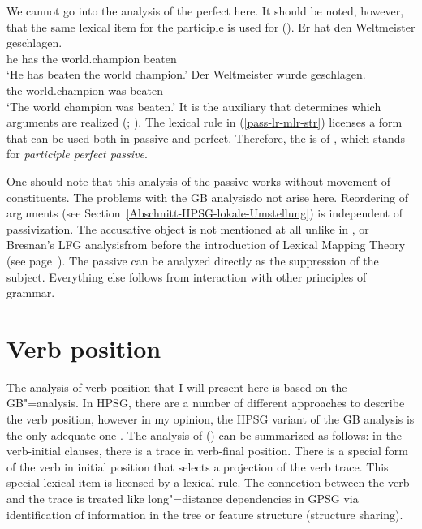 We cannot go into the analysis of the perfect here. It should be noted, however, that the same lexical
item for the participle is
used for ().
\eal
\ex 
\gll Er hat den Weltmeister geschlagen.\\
	 he has the world.champion beaten\\
\glt `He has beaten the world champion.'
\ex 
\gll Der Weltmeister wurde geschlagen.\\
	 the world.champion was beaten\\
\glt `The world champion was beaten.'
\zl
It is the auxiliary that determines which arguments are realized (\citealp{Haider86}; \citealp[Chapter~17]{MuellerLehrbuch1}).
The lexical rule in (\ref{pass-lr-mlr-str}) licenses a form that can be used both in passive and perfect. Therefore, the
\vformv is of , which stands for \emph{participle perfect passive}.

One should note that this analysis of the passive works without movement of constituents. The problems with the GB analysis\indexgb do not arise here.
Reordering of arguments (see Section~\ref{Abschnitt-HPSG-lokale-Umstellung}) is independent of passivization. The accusative object is not mentioned
at all unlike in \gpsg, \cg or Bresnan's LFG analysis\indexlfg from before the introduction of
Lexical Mapping Theory (see page~\pageref{page-LMT}). The passive can be analyzed directly as the suppression of the subject. Everything else follows from interaction with other principles of grammar.

\section{Verb position}
\label{Abschnitt-Verbstellung-HPSG}

The analysis of verb position that I will present here is based on the GB"=analysis. In HPSG, there are a number of different approaches
to describe the verb position, however in my opinion, the HPSG variant of the GB analysis is the only adequate one \citep{Mueller2005c,Mueller2005d,MuellerGS}.
The analysis of () can be summarized as follows: in the verb-initial clauses, there is a trace in verb-final position. There is a special form of the 
verb in initial position that selects a projection of the verb trace. This special lexical item is licensed by a lexical rule. The connection between the
verb and the trace is treated like long"=distance dependencies in GPSG via identification of information in the tree or feature structure (structure sharing).

